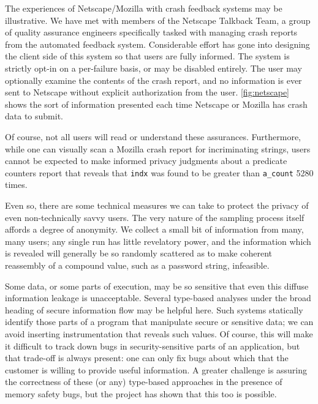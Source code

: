 The experiences of Netscape/Mozilla with crash feedback systems may be
illustrative.  We have met with members of the Netscape Talkback Team,
a group of quality assurance engineers specifically tasked with
managing crash reports from the automated feedback system.
Considerable effort has gone into designing the client side of this
system so that users are fully informed.  The system is strictly
opt-in on a per-failure basis, or may be disabled entirely.  The user
may optionally examine the contents of the crash report, and no
information is ever sent to Netscape without explicit authorization
from the user.  \autoref{fig:netscape} shows the sort of information
presented each time Netscape or Mozilla has crash data to submit.

Of course, not all users will read or understand these assurances.
Furthermore, while one can visually scan a Mozilla crash report for
incriminating strings, users cannot be expected to make informed
privacy judgments about a predicate counters report that reveals that
\texttt{indx} was found to be greater than \texttt{a\_count} 5280
times.

Even so, there are some technical measures we can take to protect the
privacy of even non-technically savvy users.  The very nature of the
sampling process itself affords a degree of anonymity.  We collect a
small bit of information from many, many users; any single run has
little revelatory power, and the information which is revealed will
generally be so randomly scattered as to make coherent reassembly of a
compound value, such as a password string, infeasible.

Some data, or some parts of execution, may be so sensitive that even
this diffuse information leakage is unacceptable.  Several type-based
analyses under the broad heading of secure information flow
\cite{volpano96:sound,1997:tapsoft:volpano,ZdZhNyMy2001} may be
helpful here.  Such systems statically identify those parts of a
program that manipulate secure or sensitive data; we can avoid
inserting instrumentation that reveals such values.  Of course, this
will make it difficult to track down bugs in security-sensitive parts
of an application, but that trade-off is always present: one can only
fix bugs about which that the customer is willing to provide useful
information.  A greater challenge is assuring the correctness of these
(or any) type-based approaches in the presence of memory safety bugs,
but the \CCured project has shown that this too is possible.

